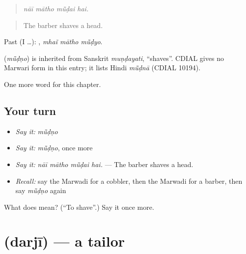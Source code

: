\begin{quote}
   
\end{quote}

\begin{quote}
\emph{nāī mātho mū̃ḍai hai.}
\end{quote}

\begin{quote}
The barber shaves a head.
\end{quote}

Past (I …):   , \emph{mhaĩ mātho mū̃ḍyo}.

\begin{cousinweb}
\textbf{} (\emph{mū̃ḍṇo}) is inherited from Sanskrit \emph{muṇḍayati}, \textquotedblleft{}shaves\textquotedblright{}. CDIAL gives no Marwari form in this entry; it lists Hindi \emph{mū̃ḍnā} (CDIAL 10194).
\end{cousinweb}

\begin{grammarlens}[title={What you've built}]
One more word for this chapter.
\end{grammarlens}

\subsection*{Your turn}
\begin{itemize}
\raggedright
  \item \emph{Say it:} \emph{mū̃ḍṇo}
  \item \emph{Say it:} \emph{mū̃ḍṇo}, once more
  \item \emph{Say it:} \emph{nāī mātho mū̃ḍai hai.} — The barber shaves a head.
  \item \emph{Recall:} say the Marwadi for a cobbler, then the Marwadi for a barber, then say \emph{mū̃ḍṇo} again
\end{itemize}

\begin{tcolorbox}[breakable,colback=teal!4,colframe=teal!35!black,title={Before you move on}]
What does  mean? (\textquotedblleft{}To shave\textquotedblright{}.) Say it once more.
\end{tcolorbox}
\section[\texorpdfstring{\mw{दरजी} (darjī)}{दरजी (darjī)}]{ (darjī) — a tailor}

